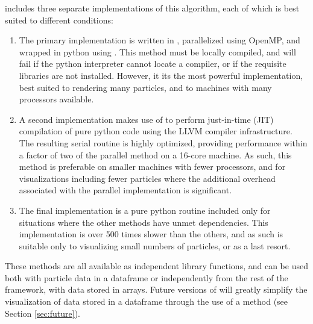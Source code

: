  includes three separate implementations of this algorithm, each of which is best suited to different conditions:
\begin{enumerate}
\item The primary implementation is written in , parallelized using OpenMP, and wrapped in python using .  This method must be locally compiled, and will fail if the python interpreter cannot locate a  compiler, or if the requisite libraries are not installed.  However, it its the most powerful implementation, best suited to rendering many particles, and to machines with many processors available.
\item A second implementation makes use of  to perform just-in-time (JIT) compilation of pure python code using the LLVM compiler infrastructure.  The resulting serial routine is highly optimized, providing performance within a factor of two of the parallel method on a 16-core machine.  As such, this method is preferable on smaller machines with fewer processors, and for visualizations including fewer particles where the additional overhead associated with the parallel implementation is significant.
\item The final implementation is a pure python routine included only for situations where the other methods have unmet dependencies. This implementation is over 500 times slower than the others, and as such is suitable only to visualizing small numbers of particles, or as a last resort.
\end{enumerate}

These methods are all available as independent library functions, and can be used both with particle data in a  dataframe or independently from the rest of the  framework, with data stored in  arrays.  
Future versions of  will greatly simplify the visualization of data stored in a  dataframe through the use of a  method (see Section \ref{sec:future}).